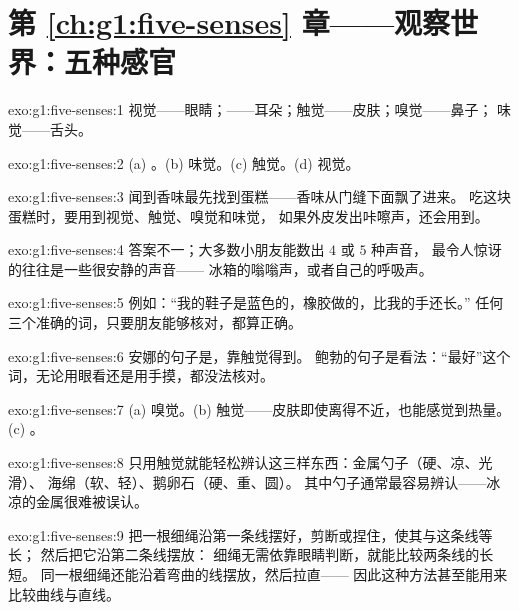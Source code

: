 \section*{第 \ref{ch:g1:five-senses} 章——观察世界：五种感官}

\begin{solution}{exo:g1:five-senses:1}
视觉——眼睛；——耳朵；触觉——皮肤；嗅觉——鼻子；
味觉——舌头。
\end{solution}

\begin{solution}{exo:g1:five-senses:2}
(a) 。(b) 味觉。(c) 触觉。(d) 视觉。
\end{solution}

\begin{solution}{exo:g1:five-senses:3}
闻到香味最先找到蛋糕——香味从门缝下面飘了进来。
吃这块蛋糕时，要用到视觉、触觉、嗅觉和味觉，
如果外皮发出咔嚓声，还会用到。
\end{solution}

\begin{solution}{exo:g1:five-senses:4}
答案不一；大多数小朋友能数出 $4$ 或 $5$ 种声音，
最令人惊讶的往往是一些很安静的声音——
冰箱的嗡嗡声，或者自己的呼吸声。
\end{solution}

\begin{solution}{exo:g1:five-senses:5}
例如：“我的鞋子是蓝色的，橡胶做的，比我的手还长。”
任何三个准确的词，只要朋友能够核对，都算正确。
\end{solution}

\begin{solution}{exo:g1:five-senses:6}
安娜的句子是，靠触觉得到。
鲍勃的句子是看法：“最好”这个词，无论用眼看还是用手摸，都没法核对。
\end{solution}

\begin{solution}{exo:g1:five-senses:7}
(a) 嗅觉。(b) 触觉——皮肤即使离得不近，也能感觉到热量。
(c) 。
\end{solution}

\begin{solution}{exo:g1:five-senses:8}
只用触觉就能轻松辨认这三样东西：金属勺子（硬、凉、光滑）、
海绵（软、轻）、鹅卵石（硬、重、圆）。
其中勺子通常最容易辨认——冰凉的金属很难被误认。
\end{solution}

\begin{solution}{exo:g1:five-senses:9}
把一根细绳沿第一条线摆好，剪断或捏住，使其与这条线等长；
然后把它沿第二条线摆放：
细绳无需依靠眼睛判断，就能比较两条线的长短。
同一根细绳还能沿着弯曲的线摆放，然后拉直——
因此这种方法甚至能用来比较曲线与直线。
\end{solution}
